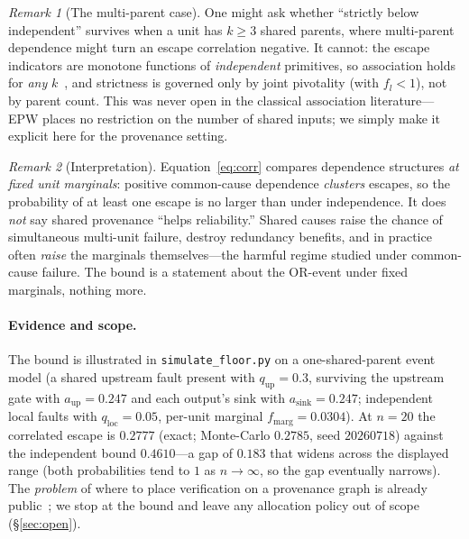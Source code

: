 \documentclass[11pt]{article}
\theoremstyle{definition}
\theoremstyle{remark}
\newtheorem{remark}{Remark}
\newcommand{\fesc}{f}
\begin{document}
\begin{remark}[The multi-parent case]
One might ask whether ``strictly below independent'' survives when a unit has $k\ge3$ shared parents,
where multi-parent dependence might turn an escape correlation negative. It cannot: the escape
indicators are monotone functions of \emph{independent} primitives, so association holds for \emph{any}
$k$~\cite{esary1967}, and strictness is governed only by joint pivotality (with $\fesc_l<1$), not by
parent count. This was never open in the classical association literature---EPW places no restriction on
the number of shared inputs; we simply make it explicit here for the provenance setting.
\end{remark}

\begin{remark}[Interpretation]\label{rem:interp}
Equation~\eqref{eq:corr} compares dependence structures \emph{at fixed unit marginals}: positive
common-cause dependence \emph{clusters} escapes, so the probability of at least one escape is no larger
than under independence. It does \emph{not} say shared provenance ``helps reliability.'' Shared causes
raise the chance of simultaneous multi-unit failure, destroy redundancy benefits, and in practice often
\emph{raise} the marginals themselves---the harmful regime studied under common-cause failure. The
bound is a statement about the OR-event under fixed marginals, nothing more.
\end{remark}

\paragraph{Evidence and scope.}
The bound is illustrated in \texttt{simulate\_floor.py} on a one-shared-parent event model (a shared
upstream fault present with $q_{\mathrm{up}}=0.3$, surviving the upstream gate with $a_{\mathrm{up}}=0.247$
and each output's sink with $a_{\mathrm{sink}}=0.247$; independent local faults with $q_{\mathrm{loc}}=0.05$,
per-unit marginal $\fesc_{\mathrm{marg}}=0.0304$). At $n=20$ the correlated escape is $0.2777$ (exact;
Monte-Carlo $0.2785$, seed $20260718$) against the independent bound $0.4610$---a gap of $0.183$ that
widens across the displayed range (both probabilities tend to $1$ as $n\to\infty$, so the gap
eventually narrows). The \emph{problem} of where to place verification on a provenance graph is already
public~\cite{ro2025sherlock}; we stop at the bound and leave any allocation policy out of scope
(\S\ref{sec:open}).
\end{document}

